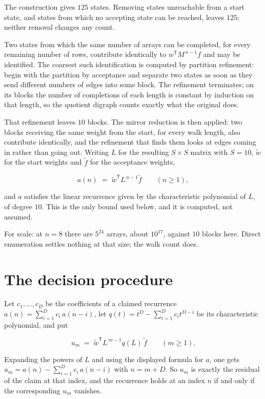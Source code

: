 \documentclass[11pt]{article}
\theoremstyle{definition}
\begin{document}
The construction gives $125$ states. Removing states unreachable from a start state, and states from which no accepting state can be reached, leaves $125$; neither removal changes any count.

Two states from which the same number of arrays can be completed, for every remaining number of rows, contribute identically to $w^{\mathsf T}M^{\,n-1}f$ and may be identified. The coarsest such identification is computed by partition refinement: begin with the partition by acceptance and separate two states as soon as they send different numbers of edges into some block. The refinement terminates; on its blocks the number of completions of each length is constant by induction on that length, so the quotient digraph counts exactly what the original does.

That refinement leaves $10$ blocks. The mirror reduction is then applied: two blocks receiving the same weight from the start, for every walk length, also contribute identically, and the refinement that finds them looks at edges coming in rather than going out. Writing $L$ for the resulting $S \times S$ matrix with $S = 10$, $\tilde w$ for the start weights and $\tilde f$ for the acceptance weights,

\[a(n) \;=\; \tilde w^{\mathsf T} L^{\,n-1} \tilde f \qquad (n \ge 1),\]

and $a$ satisfies the linear recurrence given by the characteristic polynomial of $L$, of degree $10$. This is the only bound used below, and it is computed, not assumed.

For scale: at $n = 8$ there are $5^{24}$ arrays, about $10^{17}$, against $10$ blocks here. Direct enumeration settles nothing at that size; the walk count does.

\section{The decision procedure}

Let $c_1,\dots,c_D$ be the coefficients of a claimed recurrence $a(n) = \sum_{i=1}^{D} c_i\,a(n-i)$, let $q(t) = t^{D} - \sum_{i=1}^{D} c_i t^{D-i}$ be its characteristic polynomial, and put

\[u_m \;=\; \tilde w^{\mathsf T} L^{\,m-1} q(L)\,\tilde f \qquad (m \ge 1).\]

Expanding the powers of $L$ and using the displayed formula for $a$, one gets $u_m = a(n) - \sum_{i=1}^{D} c_i\,a(n-i)$ with $n = m + D$. So $u_m$ is exactly the residual of the claim at that index, and the recurrence holds at an index $n$ if and only if the corresponding $u_m$ vanishes.
\end{document}
